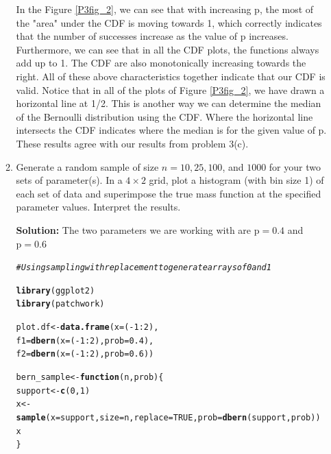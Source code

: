 \documentclass{article}\usepackage[]{graphicx}\usepackage[]{color}
\makeatletter
\newcommand{\hlnum}[1]{\textcolor[rgb]{0.686,0.059,0.569}{#1}}%
\newcommand{\hlcom}[1]{\textcolor[rgb]{0.678,0.584,0.686}{\textit{#1}}}%
\newcommand{\hlopt}[1]{\textcolor[rgb]{0,0,0}{#1}}%
\newcommand{\hlstd}[1]{\textcolor[rgb]{0.345,0.345,0.345}{#1}}%
\newcommand{\hlkwa}[1]{\textcolor[rgb]{0.161,0.373,0.58}{\textbf{#1}}}%
\newcommand{\hlkwb}[1]{\textcolor[rgb]{0.69,0.353,0.396}{#1}}%
\newcommand{\hlkwc}[1]{\textcolor[rgb]{0.333,0.667,0.333}{#1}}%
\newcommand{\hlkwd}[1]{\textcolor[rgb]{0.737,0.353,0.396}{\textbf{#1}}}%
\newenvironment{kframe}{%
 \def\at@end@of@kframe{}%
 \ifinner\ifhmode%
  \def\at@end@of@kframe{\end{minipage}}%
  \begin{minipage}{\columnwidth}%
 \fi\fi%
 \def\FrameCommand##1{\hskip\@totalleftmargin \hskip-\fboxsep
 \colorbox{shadecolor}{##1}\hskip-\fboxsep
     \hskip-\linewidth \hskip-\@totalleftmargin \hskip\columnwidth}%
 \MakeFramed {\advance\hsize-\width
   \@totalleftmargin\z@ \linewidth\hsize
   \@setminipage}}%
 {\par\unskip\endMakeFramed%
 \at@end@of@kframe}
\newenvironment{knitrout}{}{} %
\makeatother
\begin{document}
\begin{enumerate}
\begin{enumerate}
In the Figure \ref{P3fig_2}, we can see that with increasing p, the most of the "area" under the CDF is moving towards 1, which correctly indicates that the number of successes increase as the value of p increases. Furthermore, we can see that in all the CDF plots, the functions always add up to 1. The CDF are also monotonically increasing towards the right. All of these above characteristics together indicate that our CDF is valid. Notice that in all of the plots of Figure \ref{P3fig_2}, we have drawn a horizontal line at 1/2. This is another way we can determine the median of the Bernoulli distribution using the CDF. Where the horizontal line intersects the CDF indicates where the median is for the given value of p. These results agree with our results from problem 3(c).
  \item Generate a random sample of size $n=10, 25, 100$, and $1000$ for your 
  two sets of parameter(s). In a $4 \times 2$ grid, plot a histogram (with bin 
  size 1) of each set of data and superimpose the true mass function at the 
  specified parameter values. Interpret the results.
  

  \textbf{Solution:} The two parameters we are working with are $\mathrm{p=0.4}$ and $\mathrm{p=0.6}$
\begin{knitrout}
\color{fgcolor}\begin{kframe}
\begin{alltt}
\hlcom{# Using sampling with replacement to generate arrays of 0 and 1}

\hlkwd{library}\hlstd{(ggplot2)}
\hlkwd{library}\hlstd{(patchwork)}

\hlstd{plot.df} \hlkwb{<-} \hlkwd{data.frame}\hlstd{(}\hlkwc{x} \hlstd{= (}\hlopt{-}\hlnum{1}\hlopt{:}\hlnum{2}\hlstd{),}
                      \hlkwc{f1} \hlstd{=} \hlkwd{dbern}\hlstd{(}\hlkwc{x} \hlstd{= (}\hlopt{-}\hlnum{1}\hlopt{:}\hlnum{2}\hlstd{),} \hlkwc{prob} \hlstd{=} \hlnum{0.4}\hlstd{),}
                      \hlkwc{f2} \hlstd{=} \hlkwd{dbern}\hlstd{(}\hlkwc{x} \hlstd{= (}\hlopt{-}\hlnum{1}\hlopt{:}\hlnum{2}\hlstd{),} \hlkwc{prob} \hlstd{=} \hlnum{0.6}\hlstd{))}

\hlstd{bern_sample} \hlkwb{<-} \hlkwa{function}\hlstd{(}\hlkwc{n}\hlstd{,}\hlkwc{prob}\hlstd{)\{}
  \hlstd{support} \hlkwb{<-} \hlkwd{c}\hlstd{(}\hlnum{0}\hlstd{,}\hlnum{1}\hlstd{)}
  \hlstd{x} \hlkwb{<-} \hlkwd{sample}\hlstd{(}\hlkwc{x} \hlstd{= support,} \hlkwc{size}\hlstd{=n,} \hlkwc{replace}\hlstd{=}\hlnum{TRUE}\hlstd{,} \hlkwc{prob}\hlstd{=}\hlkwd{dbern}\hlstd{(support, prob))}
  \hlstd{x}
\hlstd{\}}



\end{alltt}
\end{kframe}
\end{knitrout}
\end{enumerate}
\end{enumerate}
\end{document}
